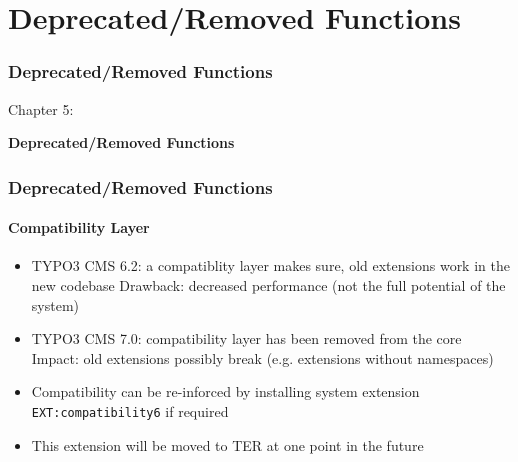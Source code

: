 %

\section{Deprecated/Removed Functions}
\begin{frame}[fragile]
	\frametitle{Deprecated/Removed Functions}

	\begin{center}\huge{Chapter 5:}\end{center}
	\begin{center}\huge{\color{typo3darkgrey}\textbf{Deprecated/Removed Functions}}\end{center}

\end{frame}


\begin{frame}[fragile]
	\frametitle{Deprecated/Removed Functions}
	\framesubtitle{Compatibility Layer}

	\begin{itemize}

		\item TYPO3 CMS 6.2: a compatiblity layer makes sure, old extensions work in the new codebase\newline
			\small
				Drawback: decreased performance (not the full potential of the system)
			\normalsize

		\item TYPO3 CMS 7.0: compatibility layer has been removed from the core\newline
			\small
				Impact: old extensions possibly break (e.g. extensions without namespaces)
			\normalsize

		\item Compatibility can be re-inforced by installing system extension \texttt{EXT:compatibility6} if required
		\item This extension will be moved to TER at one point in the future

	\end{itemize}

\end{frame}

